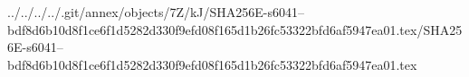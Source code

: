 ../../../../.git/annex/objects/7Z/kJ/SHA256E-s6041--bdf8d6b10d8f1ce6f1d5282d330f9efd08f165d1b26fc53322bfd6af5947ea01.tex/SHA256E-s6041--bdf8d6b10d8f1ce6f1d5282d330f9efd08f165d1b26fc53322bfd6af5947ea01.tex